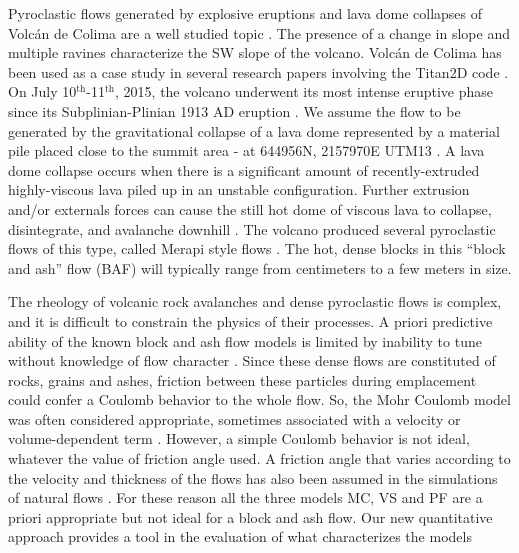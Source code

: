 \documentclass{article}
\begin{document}
Pyroclastic flows generated by explosive eruptions and lava dome collapses of Volc{\'a}n de Colima are a well studied topic \citep{DelPozzo1995,Sheridan1995,Saucedo2002,Saucedo2004,Saucedo2005,Sarocchi2011,Capra2015}. The presence of a change in slope and multiple ravines characterize the SW slope of the volcano. Volc{\'a}n de Colima has been used as a case study in several research papers involving the Titan2D code \citep{Rupp2004, Rupp2006, Dalbey2008, Yu2009, Sulpizio2010, Capra2011, Aghakhani2016}. On July 10$^{\mathrm{th}}$-11$^{\mathrm{th}}$, 2015, the volcano underwent its most intense eruptive phase since its Subplinian-Plinian 1913 AD eruption \citep{Saucedo2010, Zobin2015, ReyesDaVilla2016, Capra2016, Macorps2018}. We assume the flow to be generated by the gravitational collapse of a lava dome represented by a material pile placed close to the summit area - at 644956N, 2157970E UTM13 \citep{Rupp2006,Aghakhani2016}. A lava dome collapse occurs when there is a significant amount of recently-extruded highly-viscous lava piled up in an unstable configuration. Further extrusion and/or externals forces can cause the still hot dome of viscous lava to collapse, disintegrate, and avalanche downhill \citep{Bursik2005, Wolpert2016, Hyman2018}. The volcano produced several pyroclastic flows of this type, called Merapi style flows \citep{Macorps2018}. The hot, dense blocks in this ``block and ash'' flow (BAF) will typically range from centimeters to a few meters in size.

The rheology of volcanic rock avalanches and dense pyroclastic flows is complex, and it is difficult to constrain the physics of their processes. A priori predictive ability of the known block and ash flow models is limited by inability to tune without knowledge of flow character \citep{Patra2005}. Since these dense flows are constituted of rocks, grains and ashes, friction between these particles during emplacement could confer a Coulomb behavior to the whole flow. So, the Mohr Coulomb model was often considered appropriate, sometimes associated with a velocity or volume-dependent term \citep{Spiller2014}. However, a simple Coulomb behavior is not ideal, whatever the value of friction angle used. A friction angle that varies according to the velocity and thickness of the flows has also been assumed in the simulations of natural flows \citep{Kelfoun2011}. For these reason all the three models MC, VS and PF are a priori appropriate but not ideal for a block and ash flow. Our new quantitative approach provides a tool in the evaluation of what characterizes the models
\end{document}
